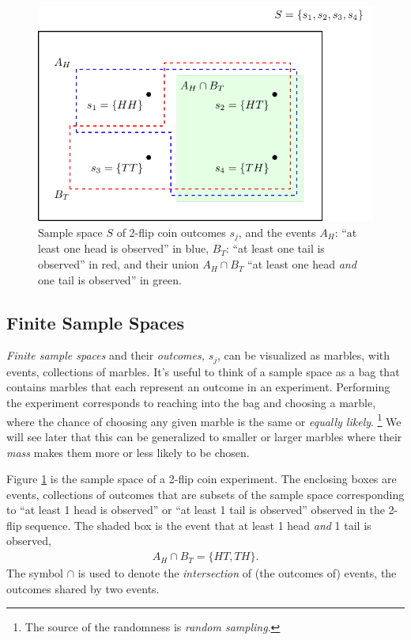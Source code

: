 \begin{figure}[h!]
\centering
\includegraphics[width=0.6\linewidth]{tikz/figure1.pdf}
\caption{Sample space \(S\) of 2-flip coin outcomes \(s_{j}\), 
and the events \(A_{H}\): ``at least one head is observed'' in blue, 
\(B_{T}\): ``at least one tail is observed'' in red,
and their union \(A_{H} \cap B_{T}\) ``at least one head \emph{and} one tail is observed'' in green.}
\label{fig:coinflip}
\end{figure}

\subsection{Finite Sample Spaces}

\emph{Finite sample spaces} and their \emph{outcomes,} \(s_{j}\), 
can be visualized as marbles, 
with events, 
collections of marbles. 
It's useful to think of a sample space 
as a bag that contains marbles that each represent 
an outcome in an experiment. 
Performing the experiment corresponds to reaching 
into the bag and choosing a marble, 
where the chance of choosing any given marble 
is the same or \emph{equally likely}.%
\footnote{%
The source of the randomness is \emph{random sampling}.} 
We will see later that this can be generalized to smaller 
or larger marbles where their \emph{mass} makes them more or
less likely to be chosen.

Figure \ref{fig:coinflip} is the sample space of a 2-flip coin experiment.
The enclosing boxes are events, 
collections of outcomes that are subsets of the sample 
space corresponding to ``at least 1 head is observed'' or 
``at least 1 tail is observed'' observed in the 2-flip sequence. 
The shaded box is the event that at least 1 head \emph{and} 1 tail is observed,
\begin{align}
A_{H} \cap B_{T} = \{HT, TH\}.
\end{align}
The symbol \(\cap\) is used to denote the \emph{intersection} of (the outcomes of) events,
the outcomes shared by two events.

